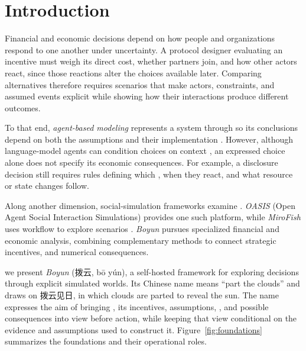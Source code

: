 
\section{Introduction}\label{sec:introduction}
Financial and economic decisions depend on how people and organizations
respond to one another under uncertainty. A protocol designer evaluating an
incentive must weigh its direct cost, whether partners join, and how other
actors react, since those reactions alter the choices available later.
Comparing alternatives therefore requires scenarios that make actors,
constraints, and assumed events explicit while showing how their interactions
produce different outcomes.

To that end, \textit{agent-based modeling} represents a system through
so its
conclusions depend on both the assumptions and their implementation
\cite{grimm2020,galan2009}. However, although language-model agents can
condition choices on context \cite{park2023,yang2025}, an expressed choice
alone does not specify its economic consequences. For example, a disclosure
decision  still requires rules defining
which , when they
react, and what resource or state changes follow.

Along another dimension, social-simulation frameworks examine . \textit{OASIS}
(Open Agent Social Interaction Simulations) provides one such platform, while
\textit{MiroFish} uses  workflow to
explore scenarios \cite{yang2025,mirofish}.  \textit{Boyun}
pursues specialized financial and economic analysis, combining complementary
methods to connect strategic incentives,  and numerical consequences.

 we
present \textit{Boyun} ({\chinesefont 拨云}, {\chinesefont bō yún}), a
self-hosted  framework for exploring decisions
through explicit simulated worlds. Its Chinese name means ``part the clouds''
and draws on {\chinesefont 拨云见日}, in which clouds are parted to reveal the
sun.  The name expresses the
aim of bringing , its incentives, assumptions,
, and possible consequences into view before
action, while keeping that view conditional on the evidence and assumptions
used to construct it. Figure~\ref{fig:foundations} summarizes the foundations
and their operational roles.

